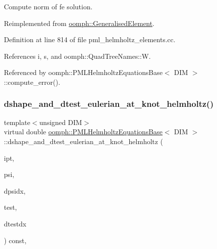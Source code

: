 Compute norm of fe solution. 



Reimplemented from \hyperlink{classoomph_1_1GeneralisedElement_af2025a472df6752a946739da58e7fb37}{oomph\+::\+Generalised\+Element}.



Definition at line 814 of file pml\+\_\+helmholtz\+\_\+elements.\+cc.



References i, s, and oomph\+::\+Quad\+Tree\+Names\+::W.



Referenced by oomph\+::\+P\+M\+L\+Helmholtz\+Equations\+Base$<$ D\+I\+M $>$\+::compute\+\_\+error().

\mbox{\label{classoomph_1_1PMLHelmholtzEquationsBase_aa283cd2415e7b9f9f3f7a71188403c8a}} 
\subsubsection{\texorpdfstring{dshape\+\_\+and\+\_\+dtest\+\_\+eulerian\+\_\+at\+\_\+knot\+\_\+helmholtz()}{dshape\_and\_dtest\_eulerian\_at\_knot\_helmholtz()}}
{\footnotesize\ttfamily template$<$unsigned D\+IM$>$ \\
virtual double \hyperlink{classoomph_1_1PMLHelmholtzEquationsBase}{oomph\+::\+P\+M\+L\+Helmholtz\+Equations\+Base}$<$ D\+IM $>$\+::dshape\+\_\+and\+\_\+dtest\+\_\+eulerian\+\_\+at\+\_\+knot\+\_\+helmholtz (\begin{DoxyParamCaption}\item[{const unsigned \&}]{ipt,  }\item[{\hyperlink{classoomph_1_1Shape}{Shape} \&}]{psi,  }\item[{\hyperlink{classoomph_1_1DShape}{D\+Shape} \&}]{dpsidx,  }\item[{\hyperlink{classoomph_1_1Shape}{Shape} \&}]{test,  }\item[{\hyperlink{classoomph_1_1DShape}{D\+Shape} \&}]{dtestdx }\end{DoxyParamCaption}) const\hspace{0.3cm}{\ttfamily [protected]}, {}}



